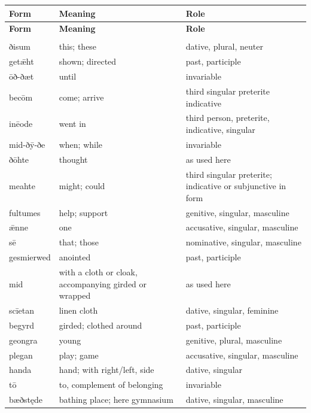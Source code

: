 \par\begingroup
\fontsize{10.5}{13.2}\selectfont
\setlength{\LTleft}{0pt}\setlength{\LTright}{\fill}
\begin{longtable}{@{}>{\raggedright\arraybackslash}p{26mm}>{\raggedright\arraybackslash}p{44.5mm}>{\raggedright\arraybackslash}p{47.88mm}@{}}
\toprule
\textbf{Form} & \textbf{Meaning} & \textbf{Role} \\
\midrule
\endfirsthead
\toprule
\textbf{Form} & \textbf{Meaning} & \textbf{Role} \\
\midrule
\endhead
\midrule
\multicolumn{3}{r}{\footnotesize Continued on the following page.}\\
\endfoot
\bottomrule
\endlastfoot
ðisum & this; these & dative, plural, neuter \\
getǣht & shown; directed & past, participle \\
ōð-ðæt & until & invariable \\
becōm & come; arrive & third singular preterite indicative \\
inēode & went in & third person, preterite, indicative, singular \\
mid-ðȳ-ðe & when; while & invariable \\
ðōhte & thought & as used here \\
meahte & might; could & third singular preterite; indicative or subjunctive in form \\
fultumes & help; support & genitive, singular, masculine \\
ǣnne & one & accusative, singular, masculine \\
sē & that; those & nominative, singular, masculine \\
gesmierwed & anointed & past, participle \\
mid & with a cloth or cloak, accompanying girded or wrapped & as used here \\
scīetan & linen cloth & dative, singular, feminine \\
begyrd & girded; clothed around & past, participle \\
geongra & young & genitive, plural, masculine \\
plegan & play; game & accusative, singular, masculine \\
handa & hand; with right/\allowbreak{}left, side & dative, singular \\
tō & to, complement of belonging & invariable \\
bæðstęde & bathing place; here gymnasium & dative, singular, masculine \\

\end{longtable}
